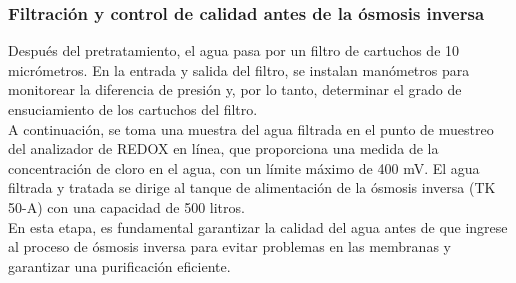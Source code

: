 \subsubsection{Filtración y control de calidad antes de la ósmosis inversa}

Después del pretratamiento, el agua pasa por un filtro de cartuchos de 10 micrómetros. En la entrada y salida del filtro, se instalan manómetros para monitorear la diferencia de presión y, por lo tanto, determinar el grado de ensuciamiento de los cartuchos del filtro.\\ 

A continuación, se toma una muestra del agua filtrada en el punto de muestreo del analizador de REDOX en línea, que proporciona una medida de la concentración de cloro en el agua, con un límite máximo de 400 mV. El agua filtrada y tratada se dirige al tanque de alimentación de la ósmosis inversa (TK 50-A) con una capacidad de 500 litros. \\

En esta etapa, es fundamental garantizar la calidad del agua antes de que ingrese al proceso de ósmosis inversa para evitar problemas en las membranas y garantizar una purificación eficiente. \\
